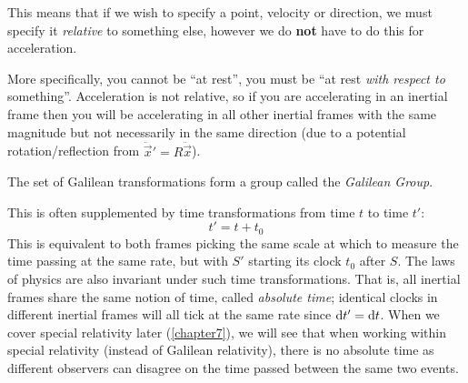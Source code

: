 \documentclass[../main.tex]{subfiles}
\begin{document}
This means that if we wish to specify a point, velocity or direction, we must specify it \textit{relative} to something else, however we do \textbf{not} have to do this for acceleration.

More specifically, you cannot be ``at rest'', you must be ``at rest \textit{with respect to} something''.
Acceleration is not relative, so if you are accelerating in an inertial frame then you will be accelerating in all other inertial frames with the same magnitude but not necessarily in the same direction (due to a potential rotation/reflection from $\ddot{\vec{x}}' = R \ddot{\vec{x}}$).
\begin{definition}
  The set of Galilean transformations form a group called the \textit{Galilean Group}.
\end{definition}
This is often supplemented by time transformations from time $t$ to time $t'$:
\[
  t' = t + t_0
\]
This is equivalent to both frames picking the same scale at which to measure the time passing at the same rate, but with $S'$ starting its clock $t_0$ after $S$.
The laws of physics are also invariant under such time transformations.
That is, all inertial frames share the same notion of time, called \textit{absolute time}; identical clocks in different inertial frames will all tick at the same rate since $\d{t'} = \d{t}$.
When we cover special relativity later (\cref{chapter7}), we will see that when working within special relativity (instead of Galilean relativity), there is no absolute time as different observers can disagree on the time passed between the same two events.
\end{document}
